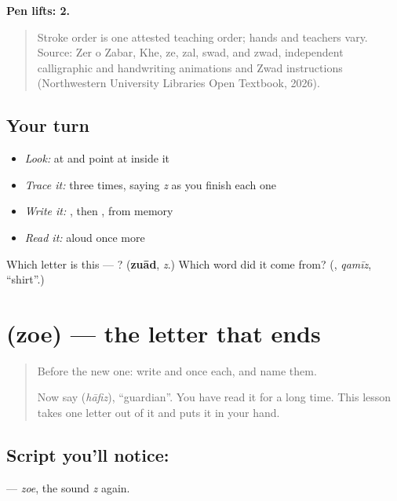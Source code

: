 \textbf{Pen lifts: 2.}

\begin{quote}
Stroke order is one attested teaching order; hands and teachers vary. Source: Zer o Zabar, Khe, ze, zal, swad, and zwad, independent  calligraphic and handwriting animations and Zwad instructions (Northwestern University Libraries Open Textbook, 2026).
\end{quote}

\subsection*{Your turn}
\begin{itemize}
\raggedright
  \item \emph{Look:} at \textbf{} and point at  inside it
  \item \emph{Trace it:}  three times, saying \emph{z} as you finish each one
  \item \emph{Write it:} , then , from memory
  \item \emph{Read it:} \textbf{} aloud once more
\end{itemize}

\begin{tcolorbox}[breakable,colback=teal!4,colframe=teal!35!black,title={Before you move on}]
Which letter is this — ? (\textbf{zuād}, \emph{z}.) Which word did it come from? (\textbf{}, \emph{qamīz}, \textquotedblleft{}shirt\textquotedblright{}.)
\end{tcolorbox}
\section[\texorpdfstring{\ur{ظ} (zoe)}{ظ (zoe)}]{ (zoe) — the letter that ends }

\label{lesson:UR-W37-zoe}



\begin{quote}
Before the new one: write  and  once each, and name them.

Now say \textbf{} (\emph{hāfiz}), \textquotedblleft{}guardian\textquotedblright{}. You have read it for a long time. This lesson takes one letter out of it and puts it in your hand.
\end{quote}

\subsection*{Script you'll notice: }
\textbf{} — \emph{zoe}, the sound \emph{z} again.


